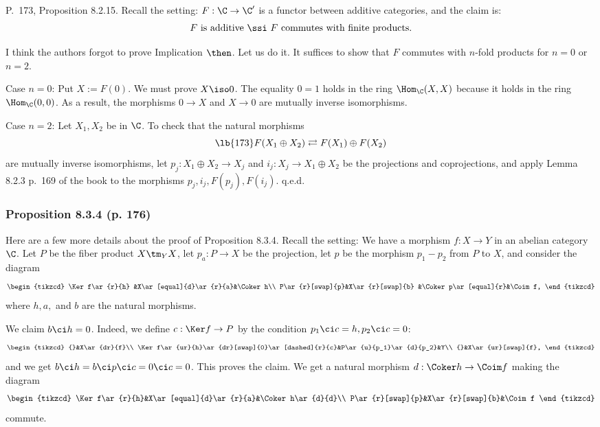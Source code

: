 \documentclass[12pt]{article}
\theoremstyle{remark}
\theoremstyle{definition}
\begin{document}
\begin{s} 
P.~173, Proposition 8.2.15. Recall the setting: $F:\C\to\C'$ is a functor between additive categories, and the claim is: 
$$
F\text{ is additive }\ssi\ F\text{ commutes with finite products}.
$$ 

I think the authors forgot to prove Implication $\then$. Let us do it. It suffices to show that $F$ commutes with $n$-fold products for $n=0$ or $n=2$. 

Case $n=0$: Put $X:=F(0)$. We must prove $X\iso 0$. The equality $0=1$ holds in the ring $\Hom_\C(X,X)$ because it holds in the ring $\Hom_\C(0,0)$. As a result, the morphisms $0\to X$ and $X\to 0$ are mutually inverse isomorphisms. 

Case $n=2$: Let $X_1,X_2$ be in $\C$. To check that the natural morphisms 
%
\begin{equation}\lb{173} 
F(X_1\oplus X_2)\rightleftarrows F(X_1)\oplus F(X_2)
\end{equation} 
%
are mutually inverse isomorphisms, let $p_j:X_1\oplus X_2\to X_j$ and $i_j:X_j\to X_1\oplus X_2$ be the projections and coprojections, and apply Lemma 8.2.3 p.~169 of the book to the morphisms $p_j,i_j,F(p_j),F(i_j)$. q.e.d.
\end{s}



\subsubsection{Proposition 8.3.4 (p. 176)}

Here are a few more details about the proof of Proposition 8.3.4. Recall the setting: We have a morphism $f:X\to Y$ in an abelian category $\C$. Let $P$ be the fiber product $X\tm_YX$, let $p_a:P\to X$ be the projection, let $p$ be the morphism $p_1-p_2$ from $P$ to $X$, and consider the diagram 
$$
\begin{tikzcd}
\Ker f\ar{r}{h} &X\ar[equal]{d}\ar{r}{a}&\Coker h\\ 
P\ar{r}[swap]{p}&X\ar{r}[swap]{b}       &\Coker p\ar[equal]{r}&\Coim f,
\end{tikzcd}
$$ 
where $h,a,$ and $b$ are the natural morphisms. 

We claim $b\ci h=0$. Indeed, we define $c:\Ker f\to P$ by the condition $p_1\ci c=h,p_2\ci c=0$: 
$$
\begin{tikzcd}
{}&X\ar{dr}{f}\\ 
\Ker f\ar{ur}{h}\ar{dr}[swap]{0}\ar[dashed]{r}{c}&P\ar{u}{p_1}\ar{d}{p_2}&Y\\ 
{}&X\ar{ur}[swap]{f},
\end{tikzcd}
$$
and we get $b\ci h=b\ci p\ci c=0\ci c=0$. This proves the claim. We get a natural morphism $d:\Coker h\to\Coim f$ making the diagram 
$$
\begin{tikzcd}
\Ker f\ar{r}{h}&X\ar[equal]{d}\ar{r}{a}&\Coker h\ar{d}{d}\\ 
P\ar{r}[swap]{p}&X\ar{r}[swap]{b}&\Coim f
\end{tikzcd}
$$ 
commute. 
\end{document}
